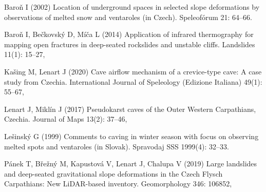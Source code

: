 {Baroň I (2002) Location of underground spaces in selected slope deformations by observations of melted snow and ventaroles (in Czech). Speleofórum 21: 64–66.

Baroň I, Bečkovský D, Míča L (2014) Application of infrared thermography for mapping open fractures in deep-seated rockslides and unstable cliffs. Landslides 11(1): 15–27,\\ 

Kašing M, Lenart J (2020) Cave airflow mechanism of a crevice-type cave: A case study from Czechia. International Journal of Speleology (Edizione Italiana) 49(1): 55–67, 

Lenart J, Miklín J (2017) Pseudokarst caves of the Outer Western Carpathians, Czechia. Journal of Maps 13(2): 37–46, 

Lešinský G (1999) Comments to caving in winter season with focus on observing melted spots and ventaroles (in Slovak). Spravodaj SSS 1999(4): 32–33.

Pánek T, Břežný M, Kapustová V, Lenart J, Chalupa V (2019) Large landslides and deep-seated gravitational slope deformations in the Czech Flysch Carpathians: New LiDAR-based inventory. Geomorphology 346: 106852, 
}


